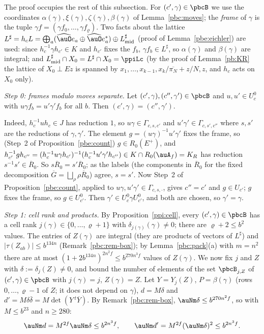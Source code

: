 \documentclass[10pt]{amsart}
\theoremstyle{definition}
\theoremstyle{remark}
\providecommand{\auG}{\overline G}
\providecommand{\aubar}[1]{\overline{#1}}
\providecommand{\pbR}{\overline R_0}
\begin{document}
The proof occupies the rest of this subsection. For $(c',\gamma)\in\pbcB$ we use the coordinates
$\alpha(\gamma),\xi(\gamma),\zeta(\gamma),\beta(\gamma)$ of Lemma~\ref{pbc:moves}; the \emph{frame} of
$\gamma$ is the tuple $\gamma f=(\gamma f_0,\dots,\gamma f_\varrho)$. Two facts about the lattice
$L^\sharp=h_cL=\bigoplus_a(\widehat\auO e_a\oplus\widehat\auO e_a^*)\oplus L^\sharp_{\rm mid}$ (proof of
Lemma~\ref{pbe:eichler}) are used: since $h_c^{-1}\gamma h_{c'}\in K$ and $h_{c'}$ fixes the $f_b$,
$\gamma f_b\in L^\sharp$, so $\alpha(\gamma)$ and $\beta(\gamma)$ are integral; and $L^\sharp_{\rm mid}\cap
X_0=L^\sharp\cap X_0=\ppiLc$ (by the proof of Lemma~\ref{pb:KR} the lattice of $X_0\perp Ez$ is
spanned by $x_1,\dots,x_{k-1},x_k/\aubar{\pi_N}+z/N,z$, and $h_c$ acts on $X_0$ only).

\emph{Step 0: frames modulo moves separate.} Let $(c',\gamma),(c'',\gamma')\in\pbcB$ and $u,u'\in U_c^0$
with $u\gamma f_b=u'\gamma'f_b$ for all $b$. Then $(c',\gamma)=(c'',\gamma')$.

Indeed, $h_c^{-1}uh_c\in J$ has reduction $1$, so $u\gamma\in\Gamma_{c,s,c'}$ and $u'\gamma'\in\Gamma_{c,
s',c''}$ where $s,s'$ are the reductions of $\gamma,\gamma'$. The element $g=(u\gamma)^{-1}u'\gamma'$ fixes
the frame, so (Step~2 of Proposition~\ref{pbe:count}) $g\in R_0(E^+)$, and $h_{c'}^{-1}gh_{c''}=(h_c^{-1}
u\gamma h_{c'})^{-1}(h_c^{-1}u'\gamma'h_{c''})\in K\cap R_0(\auA_f)=K_R$ has reduction $s^{-1}s'\in\pbR$. So
$s\pbR=s'\pbR$; as the labels (the components in $\pbR$ for the fixed decomposition $\auG=\bigsqcup_\rho
\rho\pbR$) agree, $s=s'$. Now Step~2 of Proposition~\ref{pbe:count}, applied to $u\gamma,u'\gamma'\in
\Gamma_{c,s,\cdot}$, gives $c''=c'$ and $g\in U_{c'}$; $g$ fixes the frame, so $g\in U_{c'}^0$. Then $\gamma'
\in U_c^0\gamma U_{c'}^0$, and both are chosen, so $\gamma'=\gamma$.

\emph{Step 1: cell rank and products.} By Proposition~\ref{ppi:cell}, every $(c',\gamma)\in\pbcB$ has a
cell rank $j(\gamma)\in\{0,\dots,\varrho+1\}$ with $\delta_{j(\gamma)}(\gamma)\ne0$; there are $\varrho+2\le
b^2$ values. The entries of $Z(\gamma)$ are integral (they are products of vectors of $L^\sharp$) and
$|\tau(Z_{ab})|\le b^{134n}$ (Remark~\ref{pbc:rem-box}); by Lemma~\ref{pbc:pack}(a) with $m=n^2$ there are
at most $(1+2b^{134n})^{2n^2f}\le b^{270n^3f}$ values of $Z(\gamma)$. We now fix $j$ and $Z$ with $\delta:=
\delta_j(Z)\ne0$, and bound the number of elements of the set $\pbcB_{j,Z}$ of $(c',\gamma)\in\pbcB$ with
$j(\gamma)=j$, $Z(\gamma)=Z$. Let $Y=Y_j(Z)$, $P=\beta(\gamma)$ (rows $0,\dots,\varrho-1$ of $Z$; it does not
depend on $\gamma$), $d=M\delta$ and $d'=M\delta\aubar\delta=M\det(Y\,{}^t\aubar Y)$. By
Remark~\ref{pbc:rem-box}, $\auNm\delta\le b^{270n^2f}$, so with $M\le b^{23}$ and $n\ge280$:
\begin{equation}\label{pbc:eq-moduli}
\auNm d=M^{2f}\auNm\delta\le b^{2n^3f},\qquad\auNm d'=M^{2f}(\auNm\delta)^2\le b^{2n^3f}.
\end{equation}
\end{document}
